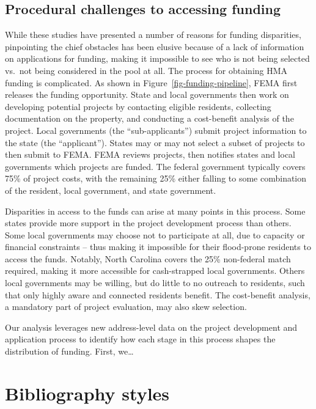 \documentclass[
  authoryear,
  preprint]{elsarticle}
\begin{document}
\subsection{Procedural challenges to accessing
funding}\label{procedural-challenges-to-accessing-funding}

While these studies have presented a number of reasons for funding
disparities, pinpointing the chief obstacles has been elusive because of
a lack of information on applications for funding, making it impossible
to see who is not being selected vs.~not being considered in the pool at
all. The process for obtaining HMA funding is complicated. As shown in
Figure~\ref{fig-funding-pipeline}, FEMA first releases the funding
opportunity. State and local governments then work on developing
potential projects by contacting eligible residents, collecting
documentation on the property, and conducting a cost-benefit analysis of
the project. Local governments (the ``sub-applicants'') submit project
information to the state (the ``applicant''). States may or may not
select a subset of projects to then submit to FEMA. FEMA reviews
projects, then notifies states and local governments which projects are
funded. The federal government typically covers 75\% of project costs,
with the remaining 25\% either falling to some combination of the
resident, local government, and state government.

Disparities in access to the funds can arise at many points in this
process. Some states provide more support in the project development
process than others. Some local governments may choose not to
participate at all, due to capacity or financial constraints -- thus
making it impossible for their flood-prone residents to access the
funds. Notably, North Carolina covers the 25\% non-federal match
required, making it more accessible for cash-strapped local governments.
Others local governments may be willing, but do little to no outreach to
residents, such that only highly aware and connected residents benefit.
The cost-benefit analysis, a mandatory part of project evaluation, may
also skew selection.

Our analysis leverages new address-level data on the project development
and application process to identify how each stage in this process
shapes the distribution of funding. First, we\ldots{}

\section{Bibliography styles}\label{bibliography-styles}
\end{document}
